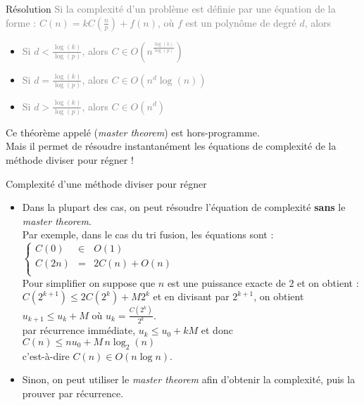 \documentclass[10pt]{beamer}
\begin{document}
\begin{frame}{\Ctitle}{\stitle}
	\begin{alertblock}{Résolution}
		\onslide<2->\textcolor{gray}{Si la complexité d'un problème est définie par une équation de la forme :
			$ C(n) = k C(\frac{n}{p}) + f(n)$, où $f$ est un polynôme de degré $d$, alors}
		\begin{itemize}
			\item<3->\textcolor{gray}{Si $d < \frac{\log(k)}{\log(p)}$, alors $C \in O(n^\frac{\log(k)}{\log(p)})$}
			\item<4->\textcolor{gray}{Si $d = \frac{\log(k)}{\log(p)}$, alors $C \in O(n^d \log(n))$}
			\item<5->\textcolor{gray}{Si $d > \frac{\log(k)}{\log(p)}$, alors $C \in O(n^d)$}
		\end{itemize}
		\textcolor{BrickRed}{\small \danger} Ce théorème appelé (\textit{master theorem}) est hors-programme. \\
		\onslide<7-> Mais il permet de résoudre instantanément les équations de complexité de la méthode diviser pour régner !
	\end{alertblock}
\end{frame}

\begin{frame}{\Ctitle}{\stitle}
	\begin{block}{Complexité d'une méthode diviser pour régner}
		\begin{itemize}
			\item<1-> Dans la plupart des cas, on peut résoudre l'équation de complexité \textbf{sans} le \textit{master theorem}.\\
				\onslide<2->\textcolor{OliveGreen}{\small Par exemple, dans le cas du tri fusion, les équations sont :
					$\left\{
						\begin{array}{lll}
							C(0)  & \in & O(1)          \\
							C(2n) & =   & 2C(n)  + O(n) \\
						\end{array}
						\right.$}\\
				\onslide<3->\textcolor{OliveGreen}{\small Pour simplifier on suppose que $n$ est une puissance exacte de $2$ et on obtient : $C(2^{k+1}) \leq 2C(2^k) + M2^k$ et en divisant par $2^{k+1}$, on obtient \\}
				\onslide<4->\textcolor{OliveGreen}{\small $u_{k+1} \leq u_{k} + M$ où $u_k = \frac{C(2^k)}{2^k}$.\\}
				\onslide<5->\textcolor{OliveGreen}{\small par récurrence immédiate, $u_{k} \leq u_0 + kM$}
				\onslide<6->\textcolor{OliveGreen}{\small et donc $C(n) \leq n u_0  + M\,n\log_2(n) $\\}
				\onslide<7->\textcolor{OliveGreen}{\small c'est-à-dire $C(n) \in O(n\log n)$.}
			\item<2-> Sinon, on peut utiliser le \textit{master theorem} afin d'obtenir la complexité, puis la prouver par récurrence.
		\end{itemize}
	\end{block}
\end{frame}
\end{document}
